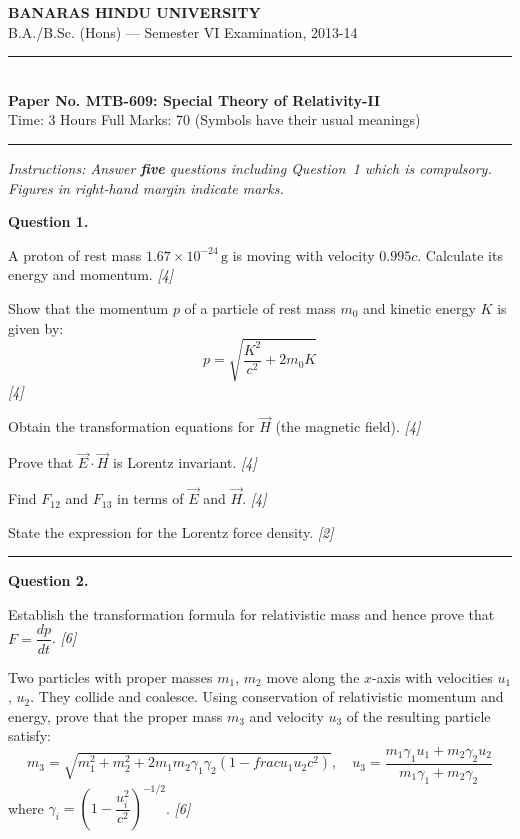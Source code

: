 \documentclass[11pt,a4paper]{article}
\newcommand{\pts}[1]{\hfill   \textit{[#1]}}
\begin{document}
\begin{center}
  {\large\bfseries BANARAS HINDU UNIVERSITY}\\[2pt]
  {\normalsize B.A./B.Sc. (Hons) --- Semester VI Examination, 2013-14}\\[6pt]
  \rule{0.8\linewidth}{0.5pt}\\[6pt]
  {\large\bfseries Paper No. MTB-609: Special Theory of Relativity-II}\\[4pt]
  {\normalsize Time: 3 Hours \hfill Full Marks: 70 \quad (Symbols have their usual meanings)}
\end{center}
\rule{\linewidth}{0.4pt}
\smallskip



\noindent   \textit{Instructions: Answer   \textbf{five} questions including Question~1 which is compulsory. Figures in right-hand margin indicate marks.}
\bigskip




\noindent   \textbf{Question 1.}

\begin{parts}
  \item A proton of rest mass $1.67  \times 10^{-24}\, \text{g}$ is moving with velocity $0.995c$. Calculate its energy and momentum. \pts{4}
  \item Show that the momentum $p$ of a particle of rest mass $m_0$ and kinetic energy $K$ is given by:
  \[
  p = \sqrt{\frac{K^2}{c^2} + 2m_0 K}
  \] \pts{4}
  \item Obtain the transformation equations for $\vec{H}$ (the magnetic field). \pts{4}
  \item Prove that $\vec{E}\cdot\vec{H}$ is Lorentz invariant. \pts{4}
  \item Find $F_{12}$ and $F_{13}$ in terms of $\vec{E}$ and $\vec{H}$. \pts{4}
  \item State the expression for the Lorentz force density. \pts{2}
\end{parts}

\medskip\rule{\linewidth}{0.2pt}

\medskip


\noindent   \textbf{Question 2.}

\begin{parts}
  \item Establish the transformation formula for relativistic mass and hence prove that $F = \dfrac{dp}{dt}$. \pts{6}
  \item Two particles with proper masses $m_1$, $m_2$ move along the $x$-axis with velocities $u_1$, $u_2$. They collide and coalesce. Using conservation of relativistic momentum and energy, prove that the proper mass $m_3$ and velocity $u_3$ of the resulting particle satisfy:
  \[
  m_3 = \sqrt{m_1^2 + m_2^2 + 2m_1 m_2 \gamma_1 \gamma_2\!\left(1 -  frac{u_1 u_2}{c^2}\right)}, \quad u_3 = \frac{m_1 \gamma_1 u_1 + m_2 \gamma_2 u_2}{m_1 \gamma_1 + m_2 \gamma_2}
  \]
  where $\gamma_i = \left(1 - \dfrac{u_i^2}{c^2}\right)^{-1/2}$. \pts{6}
\end{parts}
\end{document}

